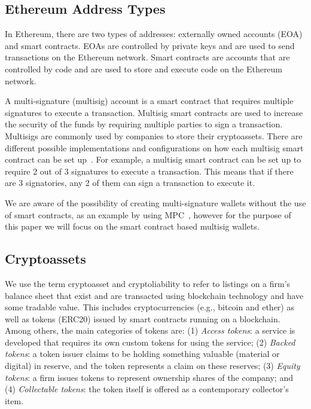 

\subsection{Ethereum Address Types}
In Ethereum, there are two types of addresses: externally owned accounts (EOA) and smart contracts. EOAs are controlled by private keys and are used to send transactions on the Ethereum network. Smart contracts are accounts that are controlled by code and are used to store and execute code on the Ethereum network. 



A multi-signature (multisig) account is a smart contract that requires multiple signatures to execute a transaction. Multisig smart contracts are used to increase the security of the funds by requiring multiple parties to sign a transaction. Multisigs are commonly used by companies to store their cryptoassets. There are different possible implementations and configurations on how each multisig smart contract can be set up~\cite{ittay2021wallet}. For example, a multisig smart contract can be set up to require 2 out of 3 signatures to execute a transaction. This means that if there are 3 signatories, any 2 of them can sign a transaction to execute it.

We are aware of the possibility of creating multi-signature wallets without the use of smart contracts, as an example by using MPC~\cite{zhao2019secure}, however for the purpose of this paper we will focus on the smart contract based multisig wallets.

\subsection{Cryptoassets}
We use the term cryptoasset and cryptoliability to refer to listings on a firm's balance sheet that exist and are transacted using blockchain technology and have some tradable value. This includes cryptocurrencies (e.g., bitcoin and ether) as well as tokens (\eg ERC20) issued by smart contracts running on a blockchain. Among others, the main categories of tokens are: (1) \textit{Access tokens}: a service is developed that requires its own custom tokens for using the service; (2) \textit{Backed tokens}: a token issuer claims to be holding something valuable (material or digital) in reserve, and the token represents a claim on these reserves; (3) \textit{Equity tokens}: a firm issues tokens to represent ownership shares of the company; and (4) \textit{Collectable tokens}: the token itself is offered as a contemporary collector's item. 


